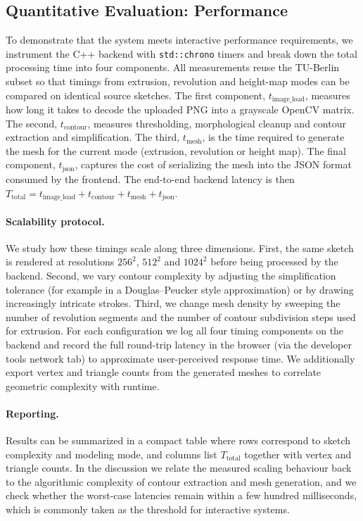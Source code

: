 \documentclass[11pt, a4paper]{article}
\begin{document}
\subsection{Quantitative Evaluation: Performance}
To demonstrate that the system meets interactive performance requirements, we instrument the C++ backend with \texttt{std::chrono} timers and break down the total processing time into four components. All measurements reuse the TU-Berlin subset so that timings from extrusion, revolution and height-map modes can be compared on identical source sketches. The first component, $t_{\text{image\_load}}$, measures how long it takes to decode the uploaded PNG into a grayscale OpenCV matrix. The second, $t_{\text{contour}}$, measures thresholding, morphological cleanup and contour extraction and simplification. The third, $t_{\text{mesh}}$, is the time required to generate the mesh for the current mode (extrusion, revolution or height map). The final component, $t_{\text{json}}$, captures the cost of serializing the mesh into the JSON format consumed by the frontend.
The end-to-end backend latency is then $T_{\text{total}} = t_{\text{image\_load}} + t_{\text{contour}} + t_{\text{mesh}} + t_{\text{json}}$.

\paragraph{Scalability protocol.} We study how these timings scale along three dimensions. First, the same sketch is rendered at resolutions $256^2$, $512^2$ and $1024^2$ before being processed by the backend. Second, we vary contour complexity by adjusting the simplification tolerance (for example in a Douglas--Peucker style approximation) or by drawing increasingly intricate strokes. Third, we change mesh density by sweeping the number of revolution segments and the number of contour subdivision steps used for extrusion.
For each configuration we log all four timing components on the backend and record the full round-trip latency in the browser (via the developer tools network tab) to approximate user-perceived response time. We additionally export vertex and triangle counts from the generated meshes to correlate geometric complexity with runtime.

\paragraph{Reporting.} Results can be summarized in a compact table where rows correspond to sketch complexity and modeling mode, and columns list $T_{\text{total}}$ together with vertex and triangle counts. In the discussion we relate the measured scaling behaviour back to the algorithmic complexity of contour extraction and mesh generation, and we check whether the worst-case latencies remain within a few hundred milliseconds, which is commonly taken as the threshold for interactive systems.
\end{document}
